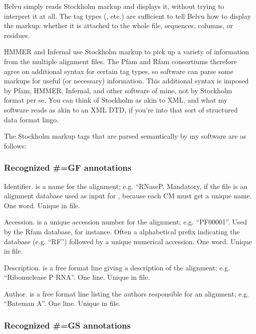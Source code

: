 Belvu simply reads Stockholm markup and displays it, without trying to
interpret it at all. The tag types (, etc.) are sufficient
to tell Belvu how to display the markup: whether it is attached to the
whole file, sequences, columns, or residues.

HMMER and Infernal use Stockholm markup to pick up a variety of
information from the multiple alignment files. The Pfam and Rfam
consortiums therefore agree on additional syntax for certain tag
types, so software can parse some markups for useful (or necessary)
information. This additional syntax is imposed by Pfam, HMMER,
Infernal, and other software of mine, not by Stockholm format per
se. You can think of Stockholm as akin to XML, and what my software
reads as akin to an XML DTD, if you're into that sort of structured
data format lingo.

The Stockholm markup tags that are parsed semantically by my software
are as follows:

\subsubsection{Recognized \#=GF annotations}
\begin{sreitems}{}
\item [\emprog{ID  <s>}] 
	Identifier.  is a name for the alignment;
	e.g. ``RNaseP. Mandatory, if the file is an alignment
        database used as input for , because 
        each CM must get a unique name. One word. Unique in file.

\item [\emprog{AC  <s>}]
	Accession.  is a unique accession number for the
	alignment; e.g. 
	``PF00001''. Used by the Rfam database, for instance. 
	Often a alphabetical prefix indicating the database
	(e.g. ``RF'') followed by a unique numerical accession.
	One word. Unique in file. 
	
\item [\emprog{DE  <s>}]
	Description.  is a free format line giving
	a description of the alignment; e.g.
	``Ribonuclease P RNA''. One line. Unique in file.

\item [\emprog{AU  <s>}]
	Author.  is a free format line listing the 
	authors responsible for an alignment; e.g. 
	``Bateman A''. One line. Unique in file.
\end{sreitems}

\subsubsection{Recognized \#=GS annotations}

